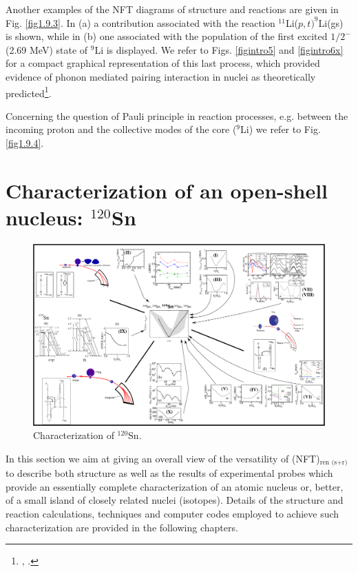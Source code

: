 Another examples of the NFT diagrams of structure and reactions are given in Fig. \ref{fig1.9.3}. In (a) a contribution associated with the reaction $^{11}$Li($p,t)^9$Li(gs) is shown, while in (b) one associated with the population of the first excited $1/2^-$ (2.69 MeV) state of $^9$Li is displayed.  We refer to Figs. \ref{figintro5} and \ref{figintro6x}   for a compact graphical representation of this last process, which provided evidence of phonon mediated pairing interaction in nuclei as theoretically predicted\footnote{\cite{Barranco:01}, \cite{Tanihata:08,Potel:10,Tanihata:13,Beceiro:15}.}.

          Concerning the question of Pauli principle in reaction processes, e.g.  between the incoming proton and the collective modes
          of the core ($^9$Li) we refer to Fig. \ref{fig1.9.4}. 
          
          
          
          
\section{Characterization of an open-shell nucleus: $^{120}$S\lowercase{n}}\label{S1.10}
          \begin{figure}
          \centerline {
          \includegraphics*[width=24cm, angle=90]{introduccion/figs/fig1_4_1v2}}
          \caption{ Characterization of $^{120}$Sn.}
          \label{fig1.4.1}
          \end{figure}
          In this section we aim at giving an overall view of
the versatility of (NFT)$_{\text{ren (s+r)}}$ to describe both structure as well as the results of experimental probes which provide an essentially complete characterization of an atomic nucleus or, better, of a small island of closely related nuclei (isotopes). Details of the structure and reaction calculations, techniques and computer codes employed to achieve such characterization are provided in the following chapters. 

